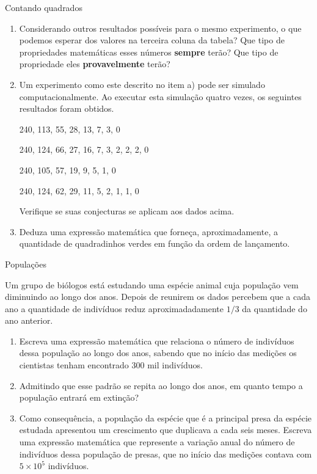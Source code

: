 \begin{task}{Contando quadrados}
\begin{enumerate}
\item Considerando outros resultados possíveis para o mesmo experimento, o que podemos esperar dos valores na terceira coluna da tabela? Que tipo de propriedades matemáticas esses números \textbf{sempre} terão? Que tipo de propriedade eles \textbf{provavelmente} terão?
\item Um experimento como este descrito no item a) pode ser simulado computacionalmente. Ao executar esta simulação quatro vezes, os seguintes resultados foram obtidos.

240, 113, 55, 28, 13, 7, 3, 0

240, 124, 66, 27, 16, 7, 3, 2, 2, 2, 0

240, 105, 57, 19, 9, 5, 1, 0

240, 124,  62, 29, 11, 5, 2, 1, 1, 0

Verifique se suas conjecturas se aplicam aos dados acima.

\item Deduza uma expressão matemática que forneça, aproximadamente, a quantidade de quadradinhos verdes em função da ordem de lançamento.

\end{enumerate}


\end{task}

\begin{task}{Populações}

Um grupo de biólogos está estudando uma espécie animal cuja população vem diminuindo ao longo dos anos. Depois de reunirem os dados percebem que a cada ano a quantidade de indivíduos reduz aproximadadamente $1/3$ da quantidade do ano anterior.

\begin{enumerate}
\item Escreva uma expressão matemática que relaciona o número de indivíduos dessa população ao longo dos anos, sabendo que no início das medições os cientistas tenham encontrado 300 mil indivíduos.

\item Admitindo que esse padrão se repita ao longo dos anos, em quanto tempo a população entrará em extinção?

\item Como consequência, a população da espécie que é a principal presa da espécie estudada apresentou um crescimento que duplicava a cada seis meses. Escreva uma expressão matemática que represente a variação anual do número de indivíduos dessa população de presas, que no início das medições contava com $5\times 10^5$ indivíduos.
\end{enumerate}

\end{task}

